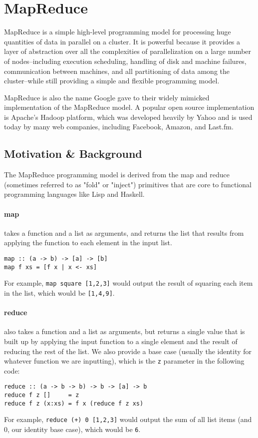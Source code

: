 \documentclass[11pt,a4paper]{report}
\begin{document}
\section{MapReduce}
MapReduce is a simple high-level programming model for processing huge quantities of data in parallel on a cluster. It is powerful because it provides a layer of abstraction over all the complexities of parallelization on a large number of nodes--including  execution scheduling, handling of disk and machine failures, communication between machines, and all partitioning of data among the cluster--while still providing a simple and flexible programming model.\cite{dean2008mapreduce}

MapReduce is also the name Google gave to their widely mimicked implementation of the MapReduce model.\cite{dean2008mapreduce} A popular open source implementation is Apache's Hadoop platform, which was developed heavily by Yahoo and is used today by many web companies, including Facebook, Amazon, and Last.fm.\cite{zaharia2008improving}

\subsection{Motivation \& Background}
The MapReduce programming model is derived from the map and reduce (sometimes referred to as "fold" or "inject") primitives that are core to functional programming languages like Lisp and Haskell.\cite{dean2008mapreduce}  

\paragraph{map} takes a function and a list as arguments, and returns the list that results from applying the function to each element in the input list.
\begin{lstlisting}
map :: (a -> b) -> [a] -> [b]
map f xs = [f x | x <- xs]
\end{lstlisting}
For example, \lstinline{map square [1,2,3]} would output the result of squaring each item in the list, which would be \lstinline{[1,4,9]}.

\paragraph{reduce} also takes a function and a list as arguments, but returns a single value that is built up by applying the input function to a single element and the result of reducing the rest of the list. We also provide a base case (usually the identity for whatever function we are inputting), which is the \lstinline{z} parameter in the following code:
\begin{lstlisting}
reduce :: (a -> b -> b) -> b -> [a] -> b
reduce f z []     = z 
reduce f z (x:xs) = f x (reduce f z xs) 
\end{lstlisting}
For example, \lstinline{reduce (+) 0 [1,2,3]} would output the sum of all list items (and 0, our identity base case), which would be \lstinline{6}.
\end{document}
